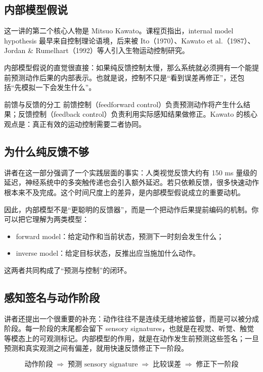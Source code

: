 \documentclass[a4paper]{article}
\begin{document}
\subsection{内部模型假说}
这一讲的第二个核心人物是 Mitsuo Kawato。课程页指出，internal model hypothesis 最早来自控制理论语境，后来被 Ito（1970）、Kawato et al.（1987）、Jordan \& Rumelhart（1992）等人引入生物运动控制研究。

内部模型假说的直觉很直接：如果纯反馈控制太慢，那么系统就必须拥有一个能提前预测动作后果的内部表示。也就是说，控制不只是“看到误差再修正”，还包括“先模拟一下会发生什么”。

\begin{knowledgebox}{前馈与反馈的分工}
前馈控制（feedforward control）负责预测动作将产生什么结果；反馈控制（feedback control）负责利用实际感知结果做修正。Kawato 的核心观点是：真正有效的运动控制需要二者协同。
\end{knowledgebox}

\subsection{为什么纯反馈不够}
讲者在这一部分强调了一个实践层面的事实：人类视觉反馈大约有 150 ms 量级的延迟，神经系统中的多突触传递也会引入额外延迟。若只依赖反馈，很多快速动作根本来不及完成。这个时间尺度上的差异，是内部模型假说成立的重要动机。

因此，内部模型不是“更聪明的反馈器”，而是一个把动作后果提前编码的机制。你可以把它理解为两类模型：

\begin{itemize}
  \item forward model：给定动作和当前状态，预测下一时刻会发生什么；
  \item inverse model：给定目标状态，反推出应当施加什么动作。
\end{itemize}

这两者共同构成了“预测与控制”的闭环。

\subsection{感知签名与动作阶段}
讲者还提出一个很重要的补充：动作往往不是连续无缝地被监督，而是可以被分成阶段。每一阶段的末尾都会留下 sensory signatures，也就是在视觉、听觉、触觉等模态上的可观测标记。内部模型的作用，就是在动作发生前预测这些签名；一旦预测和真实观测之间有偏差，就用快速反馈修正下一阶段。

\[
\text{动作阶段} \;\Rightarrow\; \text{预测 sensory signature} \;\Rightarrow\; \text{比较误差} \;\Rightarrow\; \text{修正下一阶段}
\]
\end{document}
